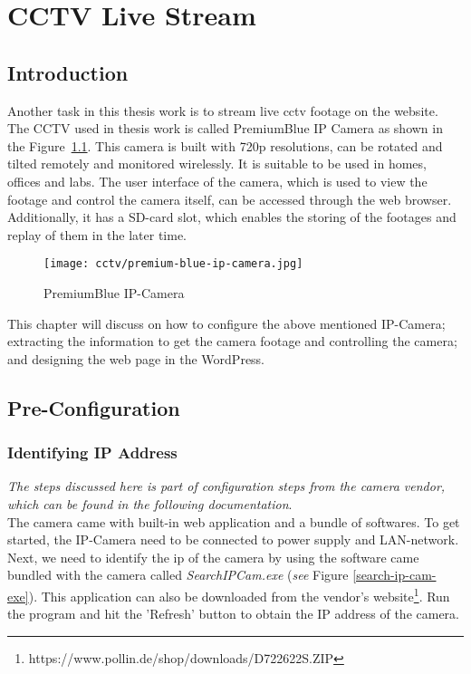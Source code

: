 \chapter{CCTV Live Stream}

\section{Introduction}
Another task in this thesis work is to stream live \ac{cctv} footage on the website. The CCTV used in thesis work is called PremiumBlue IP Camera \cite{PremiumBlue.2013} \cite{PremiumBlue.2013b} as shown in the Figure~\ref{fig:premium-blue-ip-camera}. This camera is built with 720p resolutions, can be rotated and tilted remotely and monitored wirelessly. It is suitable to be used in homes, offices and labs. The user interface of the camera, which is used to view the footage and control the camera itself, can be accessed through the web browser. Additionally, it has a SD-card slot, which enables the storing of the footages and replay of them in the later time.

\begin{figure}[ht]
\caption{PremiumBlue IP-Camera}
\label{fig:premium-blue-ip-camera}
\centering
\texttt{[image: cctv/premium-blue-ip-camera.jpg]}
\end{figure}

This chapter will discuss on how to configure the above mentioned IP-Camera; extracting the information to get the camera footage and controlling the camera; and designing the web page in the WordPress.

\section{Pre-Configuration}
\subsection{Identifying IP Address}\label{sec:cctv-identifying-ip-address}
\emph{The steps discussed here is part of configuration steps from the camera vendor, which can be found in the following documentation}\cite{PremiumBlue.2013c}.\\

The camera came with built-in web application and a bundle of softwares. To get started, the IP-Camera need to be connected to power supply and LAN-network. Next, we need to identify the \ac{ip} of the camera by using the software came bundled with the camera called \emph{SearchIPCam.exe} (\emph{see} Figure \ref{search-ip-cam-exe}). This application can also be downloaded from the vendor's website\footnote{https://www.pollin.de/shop/downloads/D722622S.ZIP}. Run the program and hit the 'Refresh' button to obtain the IP address of the camera.

